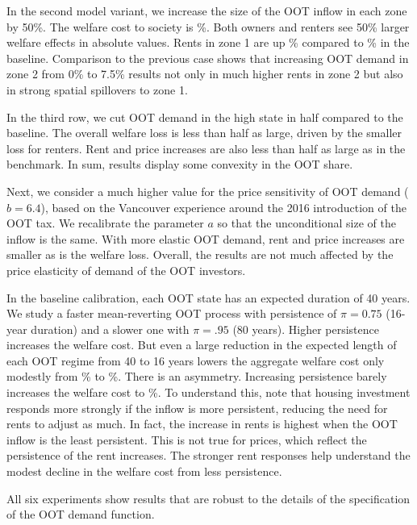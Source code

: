 \documentclass[letterpaper,12pt,dvipsnames,usenames]{article}
\theoremstyle{definition}
\begin{document}
\begin{spacing}{1.25}
{In the second model variant, we increase the size of the OOT inflow in each zone by 50\%.  The welfare cost to society is {}\%. Both owners and renters see 50\% larger welfare effects in absolute values. Rents in zone 1 are up \% compared to \% in the baseline. Comparison to the previous case shows that increasing OOT demand in zone 2 from 0\% to 7.5\% results not only in much higher rents in zone 2 but also in strong spatial spillovers to zone 1.

In the third row, we cut OOT demand in the high state in half compared to the baseline. The overall welfare loss is less than half as large, driven by the smaller loss for renters. Rent and price increases are also less than half as large as in the benchmark. In sum, results display some convexity in the OOT share. %

Next, we consider a much higher value for the price sensitivity of OOT demand ($b=6.4$), based on the Vancouver experience around the 2016 introduction of the OOT tax. We recalibrate the parameter $a$ so that the unconditional size of the inflow is the same. With more elastic OOT demand, rent and price increases are smaller as is the welfare loss. Overall, the results are not much affected by the price elasticity of demand of the OOT investors.

In the baseline calibration, each OOT state has an expected duration of 40 years. We study a faster mean-reverting OOT process with persistence of $\pi=0.75$ (16-year duration) and a slower one with $\pi=.95$ (80 years). Higher persistence increases the welfare cost. But even a large reduction in the expected length of each OOT regime from 40 to 16 years lowers the aggregate welfare cost only modestly from {}\% to {}\%. There is an asymmetry. Increasing persistence barely increases the welfare cost to {}\%. To understand this, note that housing investment responds more strongly if the inflow is more persistent, reducing the need for rents to adjust as much. In fact, the increase in rents is highest when the OOT inflow is the least persistent. This is not true for prices, which reflect the persistence of the rent increases. The stronger rent responses help understand the modest decline in the welfare cost from less persistence.

All six experiments show results that are robust to the details of the specification of the OOT demand function.


}
\end{spacing}
\end{document}
